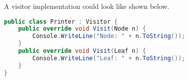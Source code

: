 A visitor implementation could look like shown below.

\begin{lstlisting}[language=csharp, caption={Example for Visitor}, captionpos=b, label={lst:visitor}]
public class Printer : Visitor {
    public override void Visit(Node n) {
        Console.WriteLine("Node: " + n.ToString());
    }
    public override void Visit(Leaf n) {
        Console.WriteLine("Leaf: " + n.ToString());
    }
}
\end{lstlisting}